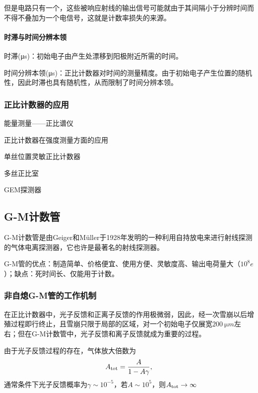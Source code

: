 但是电路只有一个，这些被响应射线的输出信号可能就由于其间隔小于分辨时间而不得不叠加为一个电信号，这就是计数率损失的来源。
\paragraph{时滞与时间分辨本领}
时滞(\si{\micro s})：初始电子由产生处漂移到阳极附近所需的时间。

时间分辨本领(\si{\micro s})：正比计数器对时间的测量精度。由于初始电子产生位置的随机性，因此时滞也具有随机性，从而限制了时间分辨本领。
\subsubsection{正比计数器的应用}
能量测量——正比谱仪

正比计数器在强度测量方面的应用

单丝位置灵敏正比计数器

多丝正比室

GEM探测器
\subsection{G-M计数管}
G-M计数管是由Geiger和Müller于1928年发明的一种利用自持放电来进行射线探测的气体电离探测器，它也许是最著名的射线探测器。

G-M管的优点：制造简单、价格便宜、使用方便、灵敏度高、输出电荷量大（$10^8e$）；缺点：死时间长、仅能用于计数。
\subsubsection{非自熄G-M管的工作机制}
在正比计数器中，光子反馈和正离子反馈的作用极微弱，因此，经一次雪崩以后增殖过程即行终止，且雪崩只限于局部的区域，对一个初始电子仅展宽$\SI{200}{\micro m}$左右；但在G-M计数管中，光子反馈和离子反馈就成为重要的过程。

由于光子反馈过程的存在，气体放大倍数为
\[
	A_\mathrm{tot}=\frac A{1-A\gamma},
\]
通常条件下光子反馈概率为$\gamma\sim 10^{-5}$，若$A\sim 10^5$，则$A_\mathrm{tot}\to\infty$

